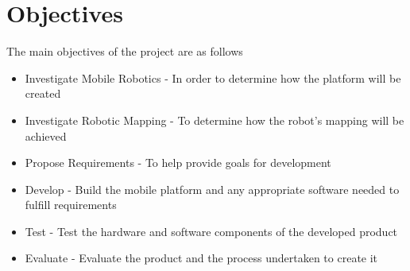 	\section{Objectives}
	The main objectives of the project are as follows
	\begin{itemize}
		\item Investigate Mobile Robotics - In order to determine how the platform will be created
		\item Investigate Robotic Mapping - To determine how the robot's mapping will be achieved
		\item Propose Requirements - To help provide goals for development
		\item Develop - Build the mobile platform and any appropriate software needed to fulfill requirements
		\item Test - Test the hardware and software components of the developed product
		\item Evaluate - Evaluate the product and the process undertaken to create it
	\end{itemize}

